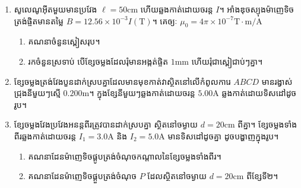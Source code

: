 \begin{enumerate}
	\item សូលេណូអ៊ីតមួយមានប្រវែង $\ell=50\si{\centi\metre}$ ហើយឆ្លងកាត់ដោយចរន្ត $I$។ អាំងឌុចស្យុងម៉ាញេទិចត្រង់ផ្ចិតមានតម្លៃ $B=12.56\times10^{-3}I\left(\si{\tesla}\right)$។ គេឲ្យៈ $\mu_{0}=4\pi\times10^{-7}\si{\tesla}\cdot\si{\metre/\ampere}$
	\begin{enumerate}[k]
		\item គណនាចំនួនស្ពៀសរុប។
		\item រកចំនួនស្រទាប់ បើខ្សែចម្លងដែលរុំមានអង្កត់ផ្ចិត $1\si{\milli\metre}$ ហើយរុំជា​​ស្ពៀ​​ជាប់ៗគ្នា។
	\end{enumerate}
	\item ខ្សែចម្លងត្រង់វែងបួនដាក់ស្របគ្នាដែលមានមុខកាត់វាស្ថិតនៅលើកំពូលការេ $ABCD$ មានរង្វាស់ជ្រុងនីមួយៗស្មើ $0.200\si{\metre}$។ ក្នុងខ្សែនីមួយៗឆ្លងកាត់ដោយចរន្ត $5.00\si{\ampere}$ ឆ្លងកាត់ដោយទិសដៅដូចរូប។
	\begin{figure}[H]
		\centering
	\end{figure}
	\item ខ្សែចម្លងវែងប្រវែងអនន្តពីរត្រូវបានដាក់ស្របគ្នា ស្ថិតនៅចម្ងាយ $d=20\si{\centi\metre}$ ពីគ្នា។ ខ្សែចម្លងទាំងពីរឆ្លងកាត់ដោយចរន្ត $I_{1}=3.0\si{\ampere}$ និង $I_{2}=5.0\si{\ampere}$ មានទិសដៅដូចគ្នា ដូចបង្ហាញក្នុងរូប។
	\begin{enumerate}
		\item គណនាដែនម៉ាញេទិចផ្គូបត្រង់ចំណុចកណ្តាលនៃខ្សែចម្លងទាំងពីរ។
		\item គណនាដែនម៉ាញេទិចផ្គួបត្រង់ចំណុច $P$ ដែលស្ថិតនៅចម្ងាយ $d=20\si{\centi\meter}$ ពីខ្សែទី២។
		\begin{figure}[H]
			\centering
\end{figure}
\end{enumerate}
\end{enumerate}
